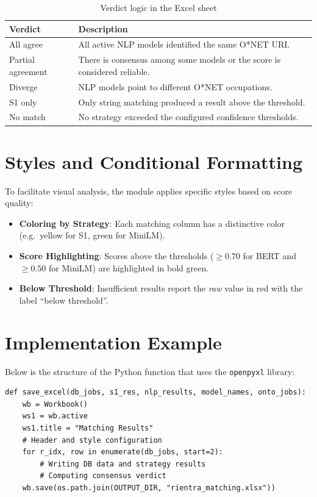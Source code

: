 \documentclass[12pt, a4paper]{report}
\begin{document}
\begin{table}[H]
\centering
\begin{tabular}{lp{9cm}}
\toprule
\textbf{Verdict} & \textbf{Description} \\
\midrule
All agree & All active NLP models identified the same O*NET URI. \\
Partial agreement & There is consensus among some models or the score is considered reliable. \\
Diverge & NLP models point to different O*NET occupations. \\
S1 only & Only string matching produced a result above the threshold. \\
No match & No strategy exceeded the configured confidence thresholds. \\
\bottomrule
\end{tabular}
\caption{Verdict logic in the Excel sheet}
\end{table}

\section{Styles and Conditional Formatting}

To facilitate visual analysis, the module applies specific styles based on score quality:

\begin{itemize}
    \item \textbf{Coloring by Strategy}: Each matching column has a distinctive color (e.g.\ yellow for S1, green for MiniLM).
    \item \textbf{Score Highlighting}: Scores above the thresholds ($\geq 0.70$ for BERT and $\geq 0.50$ for MiniLM) are highlighted in bold green.
    \item \textbf{Below Threshold}: Insufficient results report the \textit{raw} value in red with the label ``below threshold''.
\end{itemize}
\newpage
\section{Implementation Example}

Below is the structure of the Python function that uses the \texttt{openpyxl} library:

\begin{lstlisting}[caption={Snippet of the \texttt{save\_excel} function}]
def save_excel(db_jobs, s1_res, nlp_results, model_names, onto_jobs):
    wb = Workbook()
    ws1 = wb.active
    ws1.title = "Matching Results"
    # Header and style configuration
    for r_idx, row in enumerate(db_jobs, start=2):
        # Writing DB data and strategy results
        # Computing consensus verdict
    wb.save(os.path.join(OUTPUT_DIR, "rientra_matching.xlsx"))
\end{lstlisting}
\end{document}
